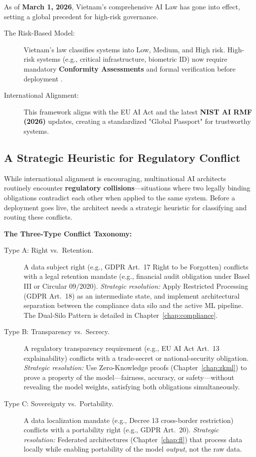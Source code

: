 As of \textbf{March 1, 2026}, Vietnam's comprehensive AI Law has gone into effect, setting a global precedent for high-risk governance.

\begin{description}
  \item[The Risk-Based Model:] Vietnam's law classifies systems into Low, Medium, and High risk. High-risk systems (e.g., critical infrastructure, biometric ID) now require mandatory \textbf{Conformity Assessments} and formal verification before deployment \cite{vn-decree13}.
  \item[International Alignment:] This framework aligns with the EU AI Act \cite{eu-ai-act} and the latest \textbf{NIST AI RMF (2026)} updates, creating a standardized "Global Passport" for trustworthy systems.
\end{description}

\subsection{A Strategic Heuristic for Regulatory Conflict}
\label{subsec:regulatory_conflict_heuristic}

While international alignment is encouraging, multinational AI architects routinely encounter \textbf{regulatory collisions}---situations where two legally binding obligations contradict each other when applied to the same system. Before a deployment goes live, the architect needs a strategic heuristic for classifying and routing these conflicts.

\textbf{The Three-Type Conflict Taxonomy:}

\begin{description}
  \item[Type A: Right vs.\ Retention.]
    A data subject right (e.g., GDPR Art.~17 Right to be Forgotten) conflicts with a legal retention mandate (e.g., financial audit obligation under Basel III or Circular 09/2020). \textit{Strategic resolution:} Apply Restricted Processing (GDPR Art.~18) as an intermediate state, and implement architectural separation between the compliance data silo and the active ML pipeline. The Dual-Silo Pattern is detailed in Chapter~\ref{chap:compliance}.
  \item[Type B: Transparency vs.\ Secrecy.]
    A regulatory transparency requirement (e.g., EU AI Act Art.~13 explainability) conflicts with a trade-secret or national-security obligation. \textit{Strategic resolution:} Use Zero-Knowledge proofs (Chapter~\ref{chap:zkml}) to prove a property of the model---fairness, accuracy, or safety---without revealing the model weights, satisfying both obligations simultaneously.
  \item[Type C: Sovereignty vs.\ Portability.]
    A data localization mandate (e.g., Decree 13 cross-border restriction) conflicts with a portability right (e.g., GDPR Art.~20). \textit{Strategic resolution:} Federated architectures (Chapter~\ref{chap:fl}) that process data locally while enabling portability of the model \emph{output}, not the raw data.
\end{description}

